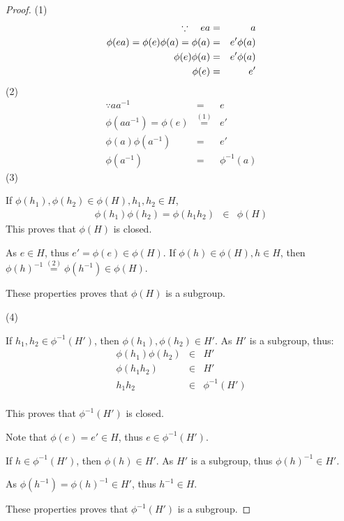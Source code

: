 \documentclass{article}
\theoremstyle{MyNonumberplain}
\theoremstyle{break}
\newtheorem*{proof}{Proof. }
\newcommand{\p}{\phi}
\newcommand{\xequal}[1]{\stackrel{#1}{=}}
\theoremstyle{break}
\theoremstyle{break}
\theoremstyle{definition}
\theoremstyle{break}
\begin{document}
\begin{thmbox}
    \begin{prfbox}
        \begin{proof}
            (1)
            \begin{eqnarray*}
            \because \text{\quad} e a & = & a\\
            \p (e a) = \p (e) \p (a) = \p (a) & = & e' \p (a)\\
            \p (e) \p (a) & = & e' \p (a)\\
            \p (e) & = & e'
            \end{eqnarray*}
            (2)
            \begin{eqnarray*}
            \because a a^{- 1} & = & e\\
            \p (a a^{- 1}) = \p (e) & \xequal{(1)} & e'\\
            \p (a) \p (a^{- 1}) & = & e'\\
            \p (a^{- 1}) & = & \p^{- 1} (a)
            \end{eqnarray*}
            (3)

            If $\p (h_1), \p (h_2) \in \p (H), h_1, h_2 \in H$,
            \begin{eqnarray*}
            \p (h_1) \p (h_2) = \p (h_1 h_2) & \in & \p (H)
            \end{eqnarray*}
            This proves that $\p (H)$ is closed.\bigskip

            As $e \in H$, thus $e' = \p (e) \in \p (H)$. If $\p (h) \in \p (H), h \in H$,
            then $\p (h)^{- 1} \xequal{(2)} \p (h^{- 1}) \in \p (H) $.\bigskip

            These properties proves that $\p (H)$ is a subgroup.\bigskip

            (4)\bigskip

            If $h_1, h_2 \in \p^{- 1} (H')$, then $\p (h_1), \p (h_2) \in H'$. As $H'$ is
            a subgroup, thus:\bigskip
            \begin{eqnarray*}
            \p (h_1) \p (h_2) & \in & H'\\
            \p (h_1 h_2) & \in & H'\\
            h_1 h_2 & \in & \p^{- 1} (H')
            \end{eqnarray*}\\
            This proves that $\p^{- 1} (H')$ is closed.\bigskip

            Note that $\p (e) = e' \in H$, thus $e \in \p^{- 1} (H')$.\bigskip

            If $h \in \p^{- 1} (H')$, then $\p (h) \in H'$. As $H'$ is a subgroup, thus
            $\p (h)^{- 1} \in H'$.\bigskip

            As $\p (h^{- 1}) = \p (h)^{- 1} \in H'$, thus $h^{- 1} \in H$.\bigskip

            These properties proves that $\p^{- 1} (H')$ is a subgroup.
        \end{proof}
    \end{prfbox}
\end{thmbox}
\end{document}
